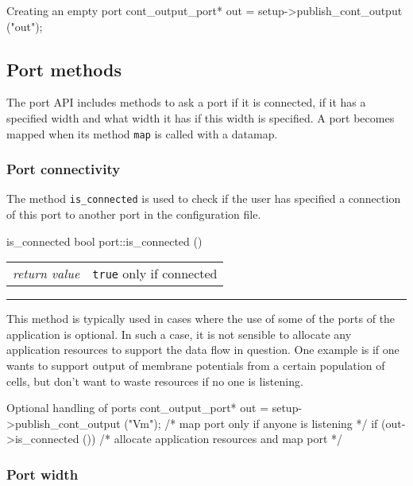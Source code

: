 \documentclass[a4paper]{report}
\makeatletter
\newenvironment{parameters}%
{\begin{tabular}{@{\hspace{2em}}lp{0.6\textwidth}}}%
{\end{tabular}\par\vspace{1mm}\par\hrule\par\vspace{5mm}}
\makeatother
\begin{document}
\begin{code}{Creating an empty port}
cont_output_port* out = setup->publish_cont_output ("out");
\end{code}

\subsection{Port methods}

The port API includes methods to ask a port if it is connected, if it
has a specified width and what width it has if this width is
specified.  A port becomes mapped when its method \lstinline|map| is
called with a datamap.

\subsubsection{Port connectivity}

The method \lstinline|is_connected| is used to check if the user has
specified a connection of this port to another port in the
configuration file.

\begin{head}{is_connected}
  bool port::is_connected ()
\end{head}
\begin{parameters}
  \emph{return value} & \lstinline|true| only if connected\\
\end{parameters}

This method is typically used in cases where the use of some of the
ports of the application is optional.  In such a case, it is not
sensible to allocate any application resources to support the data
flow in question.  One example is if one wants to support output of
membrane potentials from a certain population of cells, but don't want
to waste resources if no one is listening.

\begin{code}{Optional handling of ports}
cont_output_port* out = setup->publish_cont_output ("Vm");
/* map port only if anyone is listening */
if (out->is_connected ())
  /* allocate application resources and map port */
\end{code}

\subsubsection{Port width}
\label{sec:width}
\end{document}
